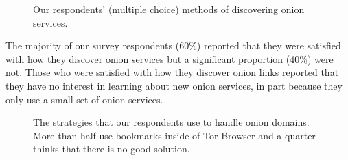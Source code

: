 \begin{figure}[t]
    \centering
    
    \caption{Our respondents' (multiple choice) methods of discovering onion
    services.}
    \label{fig:onion-discovery}
\end{figure}

The majority of our survey respondents (60\%) reported that they were satisfied with how they discover onion services but a significant proportion (40\%) were not. Those who were satisfied with how they discover onion links reported that they have no
interest in learning about new onion services, in part because they only use a
small set of onion services.  



\begin{figure}[t]
    \centering
    
    \caption{The strategies that our respondents use to handle onion domains.
    More than half use bookmarks inside of Tor Browser and a quarter thinks that
    there is no good solution.}
    \label{fig:onion-domain-mgmt}
\end{figure}


